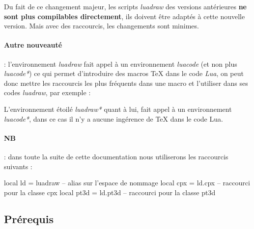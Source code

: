 Du fait de ce changement majeur, les scripts \emph{luadraw} des versions antérieures \textbf{ne sont plus compilables directement}, ils doivent être adaptés à cette nouvelle version. Mais avec des raccourcis, les changements sont minimes.

\paragraph{Autre nouveauté} : l'environnement \emph{luadraw} fait appel à un environnement \emph{luacode} (et non plus \emph{luacode*}) ce qui permet d'introduire des macros \TeX{} dans le code \emph{Lua}, on peut donc mettre les raccourcis les plus fréquents dans une macro et l'utiliser dans ses codes \emph{luadraw}, par exemple :


L'environnement étoilé \emph{luadraw*} quant à lui, fait appel à un environnement \emph{luacode*}, dans ce cas il n'y a aucune ingérence de \TeX{} dans le code Lua. 

\paragraph{NB} : dans toute la suite de cette documentation nous utiliserons les raccourcis suivants : 

\begin{Luacode}
local ld = luadraw -- alias sur l'espace de nommage
local cpx = ld.cpx -- raccourci pour la classe cpx
local pt3d = ld.pt3d -- raccourci pour la classe pt3d
\end{Luacode}



\subsection{Prérequis}

